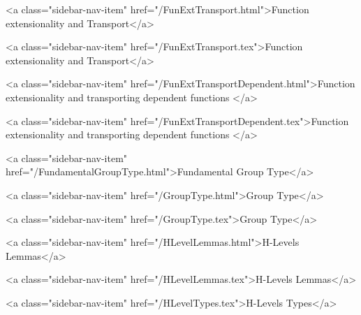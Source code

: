       
    
      
        
          <a class="sidebar-nav-item" href="/FunExtTransport.html">Function extensionality and Transport</a>
        
      
    
      
        
          <a class="sidebar-nav-item" href="/FunExtTransport.tex">Function extensionality and Transport</a>
        
      
    
      
        
          <a class="sidebar-nav-item" href="/FunExtTransportDependent.html">Function extensionality and transporting dependent functions </a>
        
      
    
      
        
          <a class="sidebar-nav-item" href="/FunExtTransportDependent.tex">Function extensionality and transporting dependent functions </a>
        
      
    
      
        
          <a class="sidebar-nav-item" href="/FundamentalGroupType.html">Fundamental Group Type</a>
        
      
    
      
        
          <a class="sidebar-nav-item" href="/GroupType.html">Group Type</a>
        
      
    
      
        
          <a class="sidebar-nav-item" href="/GroupType.tex">Group Type</a>
        
      
    
      
        
          <a class="sidebar-nav-item" href="/HLevelLemmas.html">H-Levels Lemmas</a>
        
      
    
      
        
          <a class="sidebar-nav-item" href="/HLevelLemmas.tex">H-Levels Lemmas</a>
        
      
    
      
        
          <a class="sidebar-nav-item" href="/HLevelTypes.tex">H-Levels Types</a>
        
      
    
